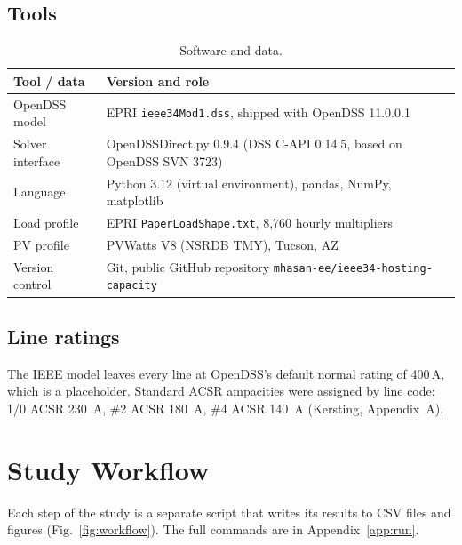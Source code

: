\documentclass[11pt,letterpaper]{article}
\begin{document}
\subsection{Tools}
\begin{table}[H]
\centering
\small
\begin{tabular}{@{}ll@{}}
\toprule
Tool / data & Version and role \\
\midrule
OpenDSS model & EPRI \texttt{ieee34Mod1.dss}, shipped with OpenDSS 11.0.0.1 \\
Solver interface & OpenDSSDirect.py 0.9.4 (DSS C-API 0.14.5, based on OpenDSS SVN 3723) \\
Language & Python 3.12 (virtual environment), pandas, NumPy, matplotlib \\
Load profile & EPRI \texttt{PaperLoadShape.txt}, 8{,}760 hourly multipliers \\
PV profile & PVWatts V8 (NSRDB TMY), Tucson, AZ \\
Version control & Git, public GitHub repository \texttt{mhasan-ee/ieee34-hosting-capacity} \\
\bottomrule
\end{tabular}
\caption{Software and data.}
\end{table}

\subsection{Line ratings}
The IEEE model leaves every line at OpenDSS's default normal rating of 400\,A, which is a placeholder. Standard
ACSR ampacities were assigned by line code: 1/0 ACSR \SI{230}{A}, \#2 ACSR \SI{180}{A}, \#4 ACSR \SI{140}{A}
(Kersting, Appendix~A).

\section{Study Workflow}
Each step of the study is a separate script that writes its results to CSV files and figures
(Fig.~\ref{fig:workflow}). The full commands are in Appendix~\ref{app:run}.
\end{document}
